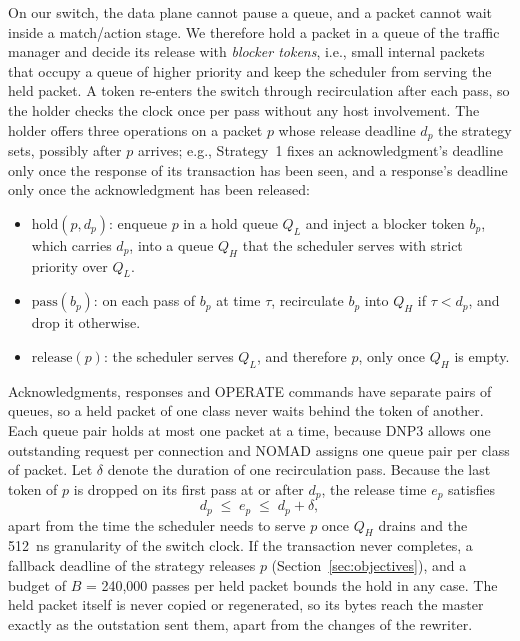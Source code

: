 On our switch, the data plane cannot pause a queue, and a packet cannot wait inside a match/action stage. We therefore hold a packet in a queue of the traffic manager and decide its release with \emph{blocker tokens}, i.e., small internal packets that occupy a queue of higher priority and keep the scheduler from serving the held packet. A token re-enters the switch through recirculation after each pass, so the holder checks the clock once per pass without any host involvement. The holder offers three operations on a packet $p$ whose release deadline $d_p$ the strategy sets, possibly after $p$ arrives; e.g., Strategy~1 fixes an acknowledgment's deadline only once the response of its transaction has been seen, and a response's deadline only once the acknowledgment has been released:
\begin{itemize}[leftmargin=*,labelindent=0pt,topsep=2pt,itemsep=1pt,parsep=0pt]
\item $\mathrm{hold}(p, d_p)$: enqueue $p$ in a hold queue $Q_L$ and inject a blocker token $b_p$, which carries $d_p$, into a queue $Q_H$ that the scheduler serves with strict priority over $Q_L$.
\item $\mathrm{pass}(b_p)$: on each pass of $b_p$ at time $\tau$, recirculate $b_p$ into $Q_H$ if $\tau < d_p$, and drop it otherwise.
\item $\mathrm{release}(p)$: the scheduler serves $Q_L$, and therefore $p$, only once $Q_H$ is empty.
\end{itemize}
Acknowledgments, responses and OPERATE commands have separate pairs of queues, so a held packet of one class never waits behind the token of another. Each queue pair holds at most one packet at a time, because DNP3 allows one outstanding request per connection and NOMAD assigns one queue pair per class of packet. Let $\delta$ denote the duration of one recirculation pass. Because the last token of $p$ is dropped on its first pass at or after $d_p$, the release time $e_p$ satisfies
\begin{equation}
\label{eq:holder}
d_p \;\leq\; e_p \;\leq\; d_p + \delta ,
\end{equation}
apart from the time the scheduler needs to serve $p$ once $Q_H$ drains and the 512~ns granularity of the switch clock. If the transaction never completes, a fallback deadline of the strategy releases $p$ (Section~\ref{sec:objectives}), and a budget of $B$ = 240,000 passes per held packet bounds the hold in any case. The held packet itself is never copied or regenerated, so its bytes reach the master exactly as the outstation sent them, apart from the changes of the rewriter.

